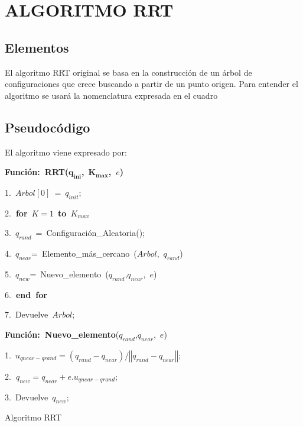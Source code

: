 \chapter{ALGORITMO RRT}


\section{Elementos}



El algoritmo RRT original se basa en la construcción de un árbol de
configuraciones que crece buscando a partir de un punto origen. Para
entender el algoritmo se usará la nomenclatura expresada en el cuadro





\newpage{}


\section{Pseudocódigo}

El algoritmo viene expresado por:

\medskip{}


%
\begin{algorithm}[H]
\begin{lyxcode}
\textbf{Función:~RRT(}$\mathbf{q}_{\mathbf{ini}}$\textbf{,}~$\mathbf{K{}_{max}}$\textbf{,~$e$)}

1.~$Arbol[0]$~=~$q_{init}$;

2.\textbf{~for}~$K=1$~\textbf{to}~$K{}_{max}$

3.~$q_{rand}$~=~Configuración\_Aleatoria();

4.~$q_{near}$=~Elemento\_más\_cercano~($Arbol$,~$q_{rand}$)

5.~$q_{new}$=~Nuevo\_elemento~($q_{rand}$,$q_{near}$,~$e$)

6.\textbf{~end~for}

7.~Devuelve~$Arbol$;~\medskip{}


\textbf{Función:~Nuevo\_elemento}($q_{rand}$,$q_{near}$,~$e$)

1.~$u_{qnear-qrand}=\left(q_{rand}-q_{near}\right)/\left\Vert q_{rand}-q_{near}\right\Vert $;

2.\textbf{~}$q_{new}=q_{near}+e.u_{qnear-qrand}$;

3.~Devuelve~$q_{new}$;
\end{lyxcode}
\caption{Algoritmo RRT}

\end{algorithm}


